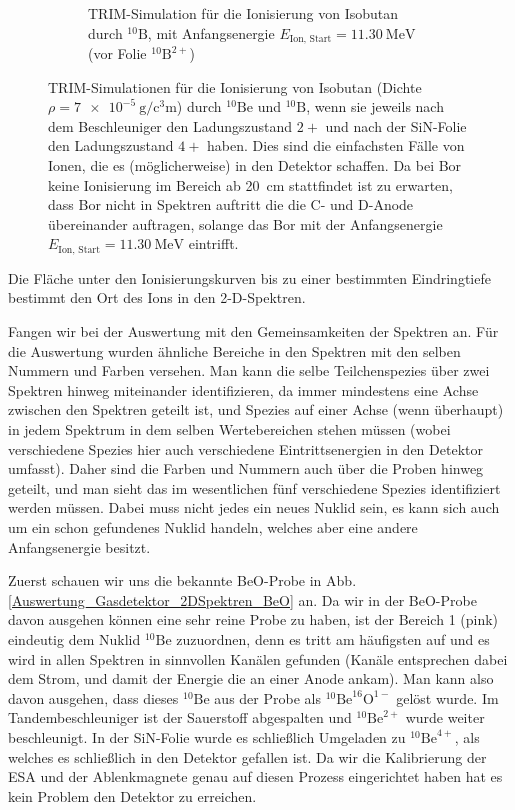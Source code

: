 \begin{figure}[H]
\begin{subfigure}[t]{0.47\textwidth}
    	\caption{TRIM-Simulation für die Ionisierung von Isobutan durch $^{10}\text{B}$, mit Anfangsenergie $E_{\text{Ion, Start}} = \SI{11.30}{\mega\electronvolt}$ (vor Folie $^{10}\text{B}^{2+}$)}
        \label{Auswertung_Gasdetektor_TRIM_sims_B}
    \end{subfigure}
    \caption{TRIM-Simulationen für die Ionisierung von Isobutan (Dichte $\rho = \SI{7e-5}{\gram\per\cubic\centi\metre}$) durch $^{10}\text{Be}$ und $^{10}\text{B}$, wenn sie jeweils nach dem Beschleuniger den Ladungszustand $2+$ und nach der SiN-Folie den Ladungszustand $4+$ haben. Dies sind die einfachsten Fälle von Ionen, die es (möglicherweise) in den Detektor schaffen. Da bei Bor keine Ionisierung im Bereich ab \SI{20}{\centi\metre} stattfindet ist zu erwarten, dass Bor nicht in Spektren auftritt die die C- und D-Anode übereinander auftragen, solange das Bor mit der Anfangsenergie $E_{\text{Ion, Start}} = \SI{11.30}{\mega\electronvolt}$ eintrifft.}
    \label{Auswertung_Gasdetektor_TRIM_sims}
\end{figure}
Die Fläche unter den Ionisierungskurven bis zu einer bestimmten Eindringtiefe bestimmt den Ort des Ions in den 2-D-Spektren.

Fangen wir bei der Auswertung mit den Gemeinsamkeiten der Spektren an.
Für die Auswertung wurden ähnliche Bereiche in den Spektren mit den selben Nummern und Farben versehen.
Man kann die selbe Teilchenspezies über zwei Spektren hinweg miteinander identifizieren, da immer mindestens eine Achse zwischen den Spektren geteilt ist, und Spezies auf einer Achse (wenn überhaupt) in jedem Spektrum in dem selben Wertebereichen stehen müssen (wobei verschiedene \glqq Spezies\grqq{} hier auch verschiedene Eintrittsenergien in den Detektor umfasst).
Daher sind die Farben und Nummern auch über die Proben hinweg geteilt, und man sieht das im wesentlichen fünf verschiedene Spezies identifiziert werden müssen.
Dabei muss nicht jedes ein neues Nuklid sein, es kann sich auch um ein schon gefundenes Nuklid handeln, welches aber eine andere Anfangsenergie besitzt.

Zuerst schauen wir uns die bekannte BeO-Probe in Abb. \ref{Auswertung_Gasdetektor_2DSpektren_BeO} an.
Da wir in der BeO-Probe davon ausgehen können eine sehr reine Probe zu haben, ist der Bereich 1 (pink) eindeutig dem Nuklid $^{10}\text{Be}$ zuzuordnen, denn es tritt am häufigsten auf und es wird in allen Spektren in sinnvollen Kanälen gefunden (Kanäle entsprechen dabei dem Strom, und damit der Energie die an einer Anode ankam).
Man kann also davon ausgehen, dass dieses $^{10}\text{Be}$ aus der Probe als $^{10}\text{Be}^{16}\text{O}^{1-}$ gelöst wurde.
Im Tandembeschleuniger ist der Sauerstoff abgespalten und $^{10}\text{Be}^{2+}$ wurde weiter beschleunigt.
In der SiN-Folie wurde es schließlich Umgeladen zu $^{10}\text{Be}^{4+}$, als welches es schließlich in den Detektor gefallen ist.
Da wir die Kalibrierung der ESA und der Ablenkmagnete genau auf diesen Prozess eingerichtet haben hat es kein Problem den Detektor zu erreichen.

